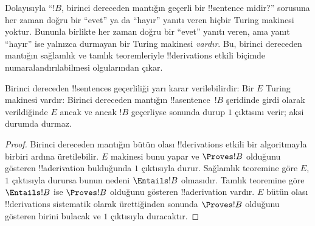 \documentclass[../../../include/open-logic-section]{subfiles}
\begin{document}
\begin{explain}
Dolayısıyla ``$!B$, birinci dereceden mantığın geçerli bir !!{sentence} midir?''
sorusuna her zaman doğru bir ``evet'' ya da ``hayır'' yanıtı veren hiçbir
Turing makinesi yoktur. Bununla birlikte her zaman doğru bir ``evet'' yanıtı
veren, ama yanıt ``hayır'' ise yalnızca durmayan bir Turing makinesi
\emph{vardır}. Bu, birinci dereceden mantığın sağlamlık ve tamlık teoremleriyle
!!{derivation}s etkili biçimde numaralandırılabilmesi olgularından çıkar.
\end{explain}

\begin{thm}
  Birinci dereceden !!{sentence}s geçerliliği yarı karar verilebilirdir:
  Bir $E$ Turing makinesi vardır: Birinci dereceden mantığın
  !!a{sentence}~$!B$ şeridinde girdi olarak
  verildiğinde $E$ ancak ve ancak $!B$ geçerliyse sonunda durup $1$ çıktısını
  verir; aksi durumda durmaz.
\end{thm}

\begin{proof}
  Birinci dereceden mantığın bütün olası !!{derivation}s etkili bir
  algoritmayla birbiri ardına üretilebilir. $E$ makinesi bunu yapar ve
  $\Proves !B$ olduğunu gösteren !!a{derivation} bulduğunda $1$ çıktısıyla
  durur. Sağlamlık teoremine göre $E$, $1$ çıktısıyla durursa bunun nedeni
  $\Entails !B$ olmasıdır. Tamlık teoremine göre $\Entails !B$ ise
  $\Proves !B$ olduğunu gösteren !!a{derivation} vardır. $E$ bütün olası
  !!{derivation}s sistematik olarak ürettiğinden sonunda $\Proves !B$
  olduğunu gösteren birini bulacak ve $1$ çıktısıyla duracaktır.
\end{proof}
\end{document}
